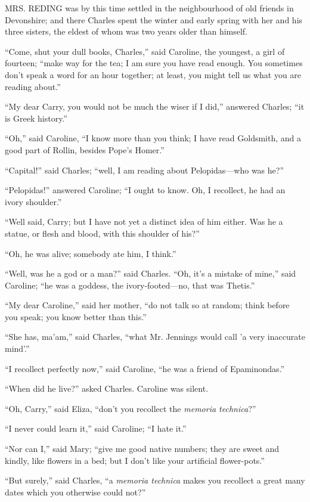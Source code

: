 MRS. REDING was
by this time settled in the neighbourhood of old friends in Devonshire;
and there Charles spent the winter and early spring with her and his
three sisters, the eldest of whom was two years older than himself.

``Come, shut your dull books, Charles,'' said Caroline, the
youngest, a girl of fourteen; ``make way for the tea; I am sure
you have read enough. You sometimes don't speak a word for an hour
together; at least, you might tell us what you are reading
about.''

``My dear Carry, you would not be much the wiser if I
did,'' answered Charles; ``it is Greek history.''

``Oh,'' said Caroline, ``I know more than you think; I
have read Goldsmith, and a good part of Rollin, besides Pope's
Homer.''

``Capital!'' said Charles; ``well, I am reading about
Pelopidas—who was he?''

``Pelopidas!'' answered Caroline; ``I ought to know.
Oh, I recollect, he had an ivory shoulder.''

``Well said, Carry; but I have not yet a distinct idea of him
either. Was he a statue, or flesh and blood, with this shoulder of
his?''

``Oh, he was alive; somebody ate him, I think.''

``Well, was he a god or a man?'' said Charles. ``Oh, it's
a mistake of mine,'' said Caroline; ``he was a goddess, the
ivory-footed—no, that was Thetis.''

``My dear Caroline,'' said her mother, ``do not talk so
at random; think before you speak; you know better than this.''

``She has, ma'am,'' said Charles, ``what Mr. Jennings
would call 'a very inaccurate mind'.''

``I recollect perfectly now,'' said Caroline, ``he was
a friend of Epaminondas.''

``When did he live?'' asked Charles. Caroline was silent.

``Oh, Carry,'' said Eliza, ``don't you recollect the \emph{memoria
technica}?''

``I never could learn it,'' said Caroline; ``I hate
it.''

``Nor can I,'' said Mary; ``give me good native
numbers; they are sweet and kindly, like flowers in a bed; but I don't
like your artificial flower-pots.''

``But surely,'' said Charles, ``a \emph{memoria technica}
makes you recollect a great many dates which you otherwise could
not?''

